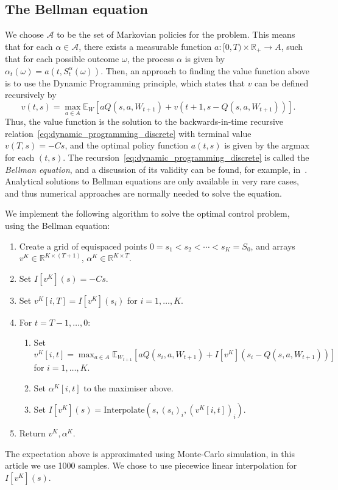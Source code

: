 \documentclass[main.tex]{subfiles}
\begin{document}
\subsection{The Bellman equation}
We choose $\mathcal A$ to be the set of Markovian policies for the
problem. This means that for each $\alpha\in \mathcal
A$, there exists a
measurable function $a:[0,T)\times \mathbb R_+\to A$, such that for each possible outcome
$\omega$, the process $\alpha$ is given by
$\alpha_t(\omega) =
a(t,S_t^\alpha(\omega))$.
Then,
an approach to finding the value function above is to use the Dynamic
Programming principle, which states that $v$ can be defined
recursively by
\begin{equation}\label{eq:dynamic_programming_discrete}
  v(t,s)=\max_{a\in A}\mathbb E_{W}\left[
    aQ(s,a,W_{t+1})
    +v(t+1,s-Q(s,a,W_{t+1}))\right].
\end{equation}
Thus, the value function is the solution to the backwards-in-time
recursive relation~\eqref{eq:dynamic_programming_discrete} with
terminal value $v(T,s)=-Cs$, and the optimal policy
function $a(t,s)$ is given by the argmax for each $(t,s)$.
The recursion~\eqref{eq:dynamic_programming_discrete} is called the
\emph{Bellman equation}, and a discussion
of its validity can be found, for example, in~\cite{bertsekas2005dynamic}.
Analytical solutions to Bellman equations are only available in very
rare cases, and thus numerical approaches are normally needed to
solve the equation.

We implement the following algorithm to solve the optimal control
problem, using the Bellman equation:
\begin{enumerate}
\item Create a grid of equispaced points $0=s_1<s_2<\cdots<s_K=S_0$, and arrays $v^K\in\mathbb R^{K\times(T+1)}$,
  $\alpha^K\in\mathbb R^{K\times T}$.
\item Set $I[v^K](s)=-Cs$.
\item Set $v^K[i,T]=I[v^K](s_i)$ for $i=1,\dots, K$.
\item For $t = T-1,\dots,0$:
  \begin{enumerate}
  \item Set $\displaystyle v^K[i,t]=\max_{a\in A}\mathbb E_{W_{t+1}}\left[ aQ(s_i,a,W_{t+1})
      +I[v^K](s_i-Q(s,a,W_{t+1}))\right]$\\ for $i=1,\dots,K$.
  \item Set $\alpha^K[i,t]$ to the maximiser above.
  \item Set $I[v^K](s) = \mathrm{Interpolate}(s, {(s_i)}_i,{(v^K[i,t])}_i)$.
  \end{enumerate}
\item Return $v^K,\alpha^K$.
\end{enumerate}
The expectation above is approximated using Monte-Carlo simulation, in
this article we use \num{1000} samples. We chose to use piecewice
linear interpolation for $I[v^K](s)$.
\end{document}
